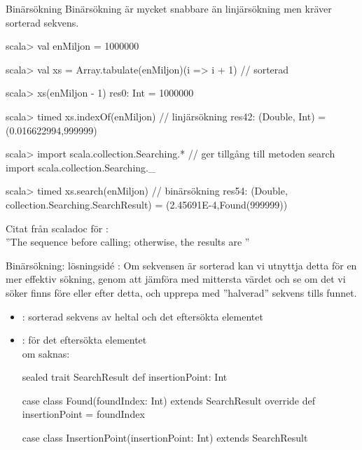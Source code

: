


\label{subsection:binsearch}

\begin{Slide}{Binärsökning}
Binärsökning är mycket snabbare än linjärsökning men kräver sorterad sekvens.
\begin{REPL}[basicstyle=\color{white}\ttfamily\SlideFontSize{6.5}{8}]
scala> val enMiljon = 1000000

scala> val xs = Array.tabulate(enMiljon)(i => i + 1)   // sorterad

scala> xs(enMiljon - 1)
res0: Int = 1000000

scala> timed { xs.indexOf(enMiljon) }        // linjärsökning
res42: (Double, Int) = (0.016622994,999999)

scala> import scala.collection.Searching.*  // ger tillgång till metoden search
import scala.collection.Searching._

scala> timed { xs.search(enMiljon) }        // binärsökning
res54: (Double, collection.Searching.SearchResult) = (2.45691E-4,Found(999999))

\end{REPL}
\pause
Citat från scaladoc för :\\
''The sequence  before calling; otherwise, the results are ''
\end{Slide}

\begin{Slide}{Binärsökning: lösningsidé}
: Om sekvensen är sorterad kan vi utnyttja detta för en mer effektiv sökning, genom att jämföra med mittersta värdet och se om det vi söker finns före eller efter detta, och upprepa med ''halverad'' sekvens tills funnet.
\pause
\begin{itemize}\SlideFontSmall
\item {}: sorterad sekvens av heltal och det eftersökta elementet
\item {}:  för det eftersökta elementet
\\ om saknas: 
\pause
\begin{Code}
sealed trait SearchResult {
  def insertionPoint: Int
}

case class Found(foundIndex: Int) extends SearchResult {
  override def insertionPoint = foundIndex
}

case class InsertionPoint(insertionPoint: Int) extends SearchResult
\end{Code}
\end{itemize}
\end{Slide}


